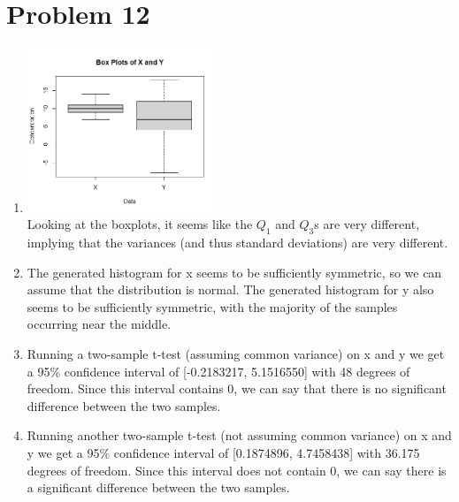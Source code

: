 \documentclass{article}
\begin{document}
\section*{Problem 12}
\begin{enumerate}[label=(\alph*)]
    \item
          \begin{multicols}{2}
              \includegraphics[width=0.45\textwidth]{xyboxplots.png} \\
              Looking at the boxplots, it seems like the \(Q_1\) and \(Q_3\)s are very different, implying that the variances (and thus standard deviations) are very different.
          \end{multicols}
    \item The generated histogram for x seems to be sufficiently symmetric, so we can assume that the distribution is normal.
          The generated histogram for y also seems to be sufficiently symmetric, with the majority of the samples occurring near the middle.
    \item Running a two-sample t-test (assuming common variance) on x and y we get a 95\% confidence interval of [-0.2183217, 5.1516550] with 48 degrees of freedom. Since this interval contains 0, we can say that there is no significant difference between the two samples.
    \item Running another two-sample t-test (not assuming common variance) on x and y we get a  95\% confidence interval of [0.1874896, 4.7458438] with 36.175 degrees of freedom. Since this interval does not contain 0, we can say there is a significant difference between the two samples.
\end{enumerate}

\pagebreak
\end{document}
